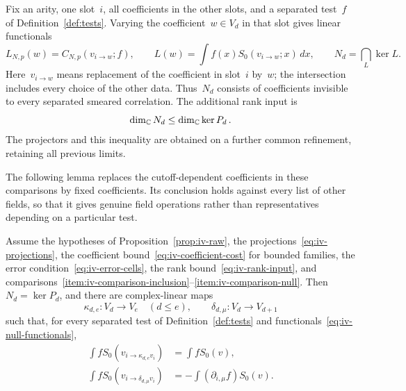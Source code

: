Fix an arity, one slot~$i$, all coefficients in the other slots, and a separated test~$f$ of Definition~\ref{def:tests}.
Varying the coefficient~$w\in V_d$ in that slot gives linear functionals
\begin{equation}\label{eq:iv-null-functionals}
 L_{N,p}(w)=C_{N,p}(v_{i\to w};f),\qquad
 L(w)=\int f(x)S_0(v_{i\to w};x)\,dx,\qquad
 N_d=\bigcap_L\ker L.
\end{equation}
Here~$v_{i\to w}$ means replacement of the coefficient in slot~$i$ by~$w$; the intersection includes every choice of the other data.
Thus~$N_d$ consists of coefficients invisible to every separated smeared correlation.
The additional rank input is
\begin{equation}\label{eq:iv-rank-input}
\dim_\mathbb C N_d\le\dim_\mathbb C\ker P_d\,.
\end{equation}
The projectors and this inequality are obtained on a further common refinement, retaining all previous limits.

The following lemma replaces the cutoff-dependent coefficients in these comparisons by fixed coefficients.
Its conclusion holds against every list of other fields, so that it gives genuine field operations rather than representatives depending on a particular test.

\begin{lemma}\label{lem:iv-representatives}
Assume the hypotheses of Proposition~\ref{prop:iv-raw}, the projections~\eqref{eq:iv-projections}, the coefficient bound~\eqref{eq:iv-coefficient-cost} for bounded families, the error condition~\eqref{eq:iv-error-cells}, the rank bound~\eqref{eq:iv-rank-input}, and comparisons~\ref{item:iv-comparison-inclusion}--\ref{item:iv-comparison-null}.
Then~$N_d=\ker P_d$, and there are complex-linear maps
\begin{equation*}
 \kappa_{d,e}:V_d\longrightarrow V_e\quad(d\le e),\qquad
 \delta_{d,\mu}:V_d\longrightarrow V_{d+1}
\end{equation*}
such that, for every separated test of Definition~\ref{def:tests} and functionals~\eqref{eq:iv-null-functionals},
\begin{equation}\label{eq:iv-weak-identities}
\begin{aligned}
 \int fS_0(v_{i\to\kappa_{d,e}v_i})&=\int fS_0(v),\\
 \int fS_0(v_{i\to\delta_{d,\mu}v_i})&=-\int(\partial_{i,\mu}f)S_0(v).
\end{aligned}
\end{equation}
\end{lemma}

